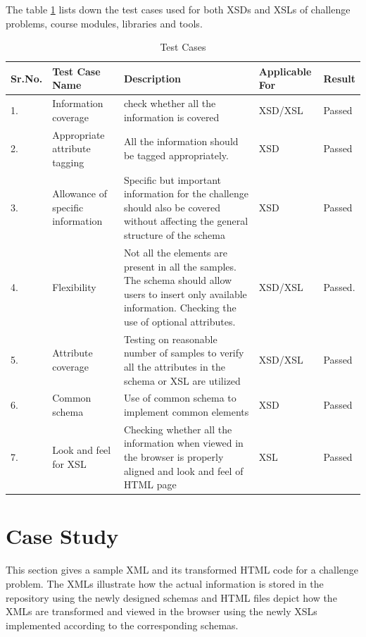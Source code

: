 \documentclass[11pt,letterpaper]{report}
\begin{document}
The table \ref{table:test} lists down the test cases used for both XSDs and XSLs of challenge problems, course modules, libraries and tools.
\begin{table}
\begin{tabular}{| l | p{2cm} | p{5cm} | p{2cm} | p{1cm} |}
\hline \textbf{Sr.No.} & \textbf{Test Case Name} & \textbf{Description} & \textbf{Applicable For} & \textbf{Result} \\ \hline 1. & Information coverage & check whether all the information is covered & XSD/XSL & Passed \\ 
\hline 2. & Appropriate attribute tagging & All the information should be tagged appropriately.  & XSD & Passed  \\  
\hline 3.& Allowance of specific information  & Specific but important information for the challenge should also be covered without affecting the general structure of the schema & XSD & Passed \\ 
\hline 4.& Flexibility & Not all the elements are present in all the samples. The schema should allow users to insert only available information. Checking the use of optional attributes. & XSD/XSL & Passed. \\ 
\hline 5. & Attribute coverage & Testing on reasonable number of samples to verify all the attributes in the schema or XSL are utilized & XSD/XSL & Passed \\  
\hline 6. & Common schema & Use of common schema to implement common elements & XSD & Passed \\  
\hline 7. & Look and feel for XSL & Checking whether all the information when viewed in the browser is properly aligned and look and feel of HTML page & XSL & Passed \\ 
\hline
\end{tabular}
\caption[Table caption text]{Test Cases}
\label{table:test}
\end{table}
\pagebreak
\section{Case Study}
This section gives a sample XML and its transformed HTML code for a challenge problem. The XMLs illustrate how the actual information is stored in the repository using the newly designed schemas and HTML files depict how the XMLs are transformed and viewed in the browser using the newly XSLs implemented according to the corresponding schemas. 
\end{document}
